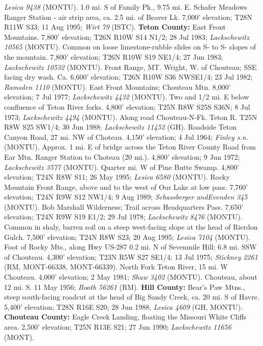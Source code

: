 \textit{Lesica 9438} (MONTU).
1.0 mi. S of Family Pk., 9.75 mi. E. Schafer Meadows Ranger Station - air strip
area, ca. 2.5 mi. of Beaver Lk. 7,000' elevation; T28N R11W S33; 11 Aug 1995;
\textit{Wirt 79} (ISTC).
  \textbf{Teton County:}
East Front Mountains. 7,800' elevation; T26N R10W S14 N1/2; 28 Jul 1983;
\textit{Lackschewitz 10565} (MONTU).
Common on loose limestone-rubble slides on S- to S- slopes of the mountain.
7,800' elevation; T26N R10W S19 NE1/4; 27 Jun 1983;
\textit{Lackschewitz 10532} (MONTU).
Front Range, MT. Wright, W. of Chouteau; SSE facing dry wash. Ca. 6,600'
elevation; T26N R10W S36 NWSE1/4; 23 Jul 1982; \textit{Ramsden 1110} (MONTU).
East Front Mountains; Chouteau Mtn. 8,000' elevation; 7 Jul 1977;
\textit{Lackschewitz 4432} (MONTU).
Two and 1/2 mi. E below confluence of Teton River forks. 4,800' elevation;
T25N R8W S25S S36N; 8 Jul 1973; \textit{Lackschewitz 4494} (MONTU).
Along road Chouteau-N-Fk. Teton R. T25N R8W S25 SW1/4; 30 Jun 1988;
\textit{Lackschewitz 11452} (GH).
Roadside Teton Canyon Road, 27 mi. NW of Choteau. 4,150' elevation;
4 Jul 1964; \textit{Finley s.n.} (MONTU).
Approx. 1 mi. E of bridge across the Teton River County Road from Ear Mtn.
Ranger Station to Choteau (20 mi.). 4,800' elevation; 9 Jun 1972;
\textit{Lackschewitz 3577} (MONTU).
Quarter mi. W of Pine Butte Swamp. 4,800' elevation; T24N R8W S11; 26 May 1995;
\textit{Lesica 6580} (MONTU).
Rocky Mountain Front Range, above and to the west of Our Lake at low pass.
7,760' elevation; T24N R9W S12 NW1/4; 9 Aug 1989;
\textit{Schassberger andEvenden 345} (MONTU).
Bob Marshall Wilderness; Trail across Headquarters Pass. 7,650' elevation;
T24N R9W S19 E1/2; 29 Jul 1978; \textit{Lackschewitz 8476} (MONTU).
Common in shaly, barren soil on a steep west-facing slope at the head of
Rierdon Gulch. 7,500' elevation; T24N R8W S23; 20 Aug 1995;
\textit{Lesica 7104} (MONTU).
Foot of Rocky Mts., along Hwy US-287 0.2 mi. N of Sevenmile Hill; 6.8 mi. SSW
of Chouteau. 4,300' elevation; T23N R5W S27 SE1/4; 13 Jul 1975;
\textit{Stickney 2261} (RM, MONT-66338, MONT-66339).
North Fork Teton River, 15 mi. W Chouteau. 4,000' elevation; 2 May 1981;
\textit{Shaw 3402} (MONTU).
Chouteau, about 12 mi. S. 11 May 1956; \textit{Booth 56261} (RM).
  \textbf{Hill County:}
Bear's Paw Mtns., steep south-facing roadcut at the head of Big Sandy Creek,
ca. 20 mi. S of Havre. 5,400' elevation; T28N R16E S20; 28 Jun 1988;
\textit{Lesica 4609} (GH, MONTU).
  \textbf{Chouteau County:}
Eagle Creek Landing, floating the Missouri White Cliffs area. 2,500' elevation;
T25N R13E S21; 27 Jun 1990; \textit{Lackschewitz 11656} (MONT).
